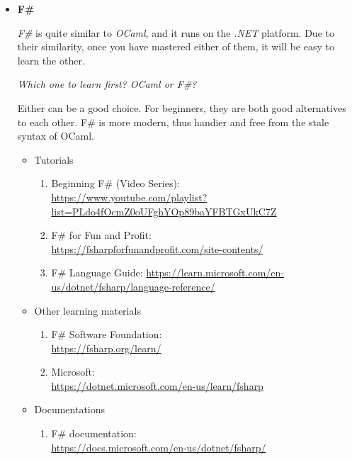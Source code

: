 \documentclass{article}
\begin{document}
\begin{itemize}
    \item \textbf{F\#}
    
    \emph{F\#} is quite similar to \emph{OCaml}, and it runs on the \emph{.NET} platform.
    Due to their similarity, once you have mastered either of them, it will be easy to learn the other.
    
    \emph{Which one to learn first? OCaml or F\#?}
    
    Either can be a good choice. For beginners, they are both good alternatives to each other. F\# is more modern, thus handier and free from the stale syntax of OCaml.

    \begin{itemize}
        \item Tutorials
        \begin{enumerate}
            \item Beginning F\# (Video Series):\\
            \href{https://www.youtube.com/playlist?list=PLdo4fOcmZ0oUFghYOp89baYFBTGxUkC7Z}{https://www.youtube.com/playlist?list=PLdo4fOcmZ0oUFghYOp89baYFBTGxUkC7Z}
            \item F\# for Fun and Profit:\\
            \href{https://fsharpforfunandprofit.com/site-contents/}{https://fsharpforfunandprofit.com/site-contents/}
            \item F\# Language Guide:
            \href{https://learn.microsoft.com/en-us/dotnet/fsharp/language-reference/}{https://learn.microsoft.com/en-us/dotnet/fsharp/language-reference/}
        \end{enumerate}
        \item Other learning materials
        \begin{enumerate}
            \item F\# Software Foundation:\\
            \href{https://fsharp.org/learn/}{https://fsharp.org/learn/}
            \item Microsoft:\\
            \href{https://dotnet.microsoft.com/en-us/learn/fsharp}{https://dotnet.microsoft.com/en-us/learn/fsharp}
        \end{enumerate}
        \item Documentations
        \begin{enumerate}
            \item F\# documentation:\\
        \href{https://docs.microsoft.com/en-us/dotnet/fsharp/}{https://docs.microsoft.com/en-us/dotnet/fsharp/}

\end{enumerate}
\end{itemize}
\end{itemize}
\end{document}

